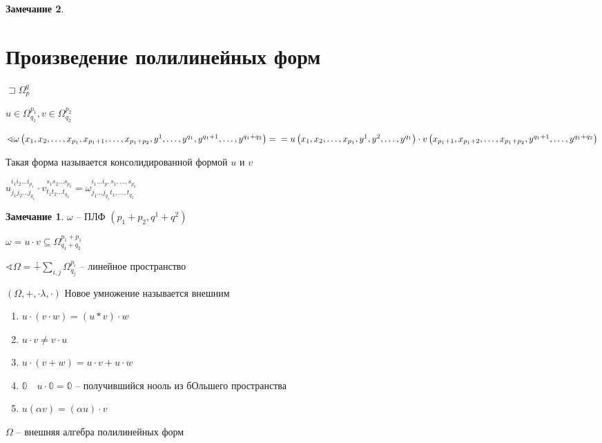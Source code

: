 \documentclass{book}
\theoremstyle{definition}
\newtheorem*{note}{Замечание}
\begin{document}
\begin{note}
  \section{Произведение полилинейных форм}

$\sqsupset \Omega_p^q$

\begin{definition}
    $u\in \Omega_{q_1}^{p_1}, v\in \Omega_{q_2}^{p_2}$

    $\sphericalangle \omega \left( x_1, x_2, \ldots, x_{p_1}, x_{p_1+1}, \ldots, x_{p_1+p_2}, y^1, \ldots, y^{q_1}, y^{q_1+1}, \ldots, y^{q_1+q_2} \right) =\\ = u\left( x_1, x_2, \ldots, x_{p_1}, y^1, y^2, \ldots, y^{q_1} \right)  \cdot v\left( x_{p_1+1}, x_{p_1+2}, \ldots, x_{p_1+p_2}, y^{q_1+1}, \ldots, y^{q_1+q_2} \right) $ 

    Такая форма называется консолидированной формой $u$ и  $v$

    $u^{i_1 i_2 \ldots i_{p_1}}_{j_1 j_2 \ldots j_{q_1}} \cdot v_{t_1 t_2 \ldots t_{q_2}}^{s_1 s_2 \ldots s_{p_2}} = \omega^{i_1 \ldots i_p, s_1, \ldots, s_{p_2}}_{j_1 \ldots j_{q_1} t_1, \ldots, t_{q_2}}$
\end{definition}

\begin{note}
    $\omega$ -- ПЛФ  $(p_1+p_2, q^1+ q^2)$

    $\omega = u\cdot v \subseteq \Omega_{q_1+q_2}^{p_1+p_1}$

    $\sphericalangle \Omega = \dotplus \sum_{i, j} \Omega_{q_j}^{p_i}$ -- линейное пространство

    $\left( \Omega, +, \cdot \lambda, \cdot  \right) $ Новое умножение называется внешним
\end{note}

\begin{property}
    \begin{enumerate}
        \item $u\cdot (v\cdot w) = (u*v)\cdot w$
        \item $u\cdot v \neq  v \cdot  u$
        \item $u\cdot (v+w) = u\cdot v+u\cdot w$
        \item $\mathds{0}\quad u\cdot \mathds{0} = \mathds{0}$ -- получившийся нооль из бОльшего пространства
        \item $u(\alpha v) = (\alpha u)\cdot v$
    \end{enumerate}
\end{property}

\begin{definition}
    $\Omega$ -- внешняя алгебра полилинейных форм
\end{definition}
 \end{note}
\end{document}
